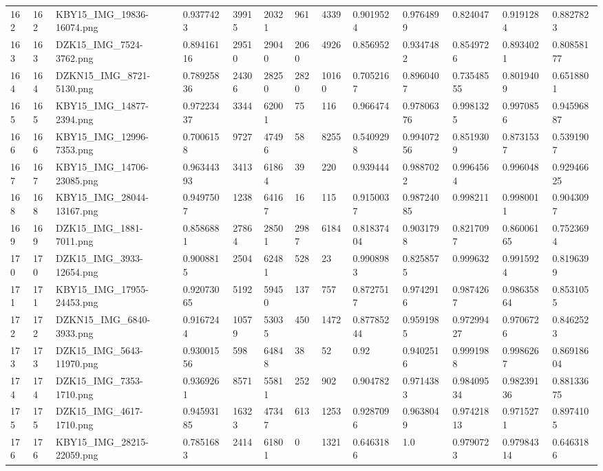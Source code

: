 \documentclass[11pt, a4paper, twoside]{report}
\begin{document}
\begin{longtable}[c]{@{}lllllllllllll@{}}
162 & 162 & KBY15\_IMG\_19836-16074.png & 0.9377423 & 39915 & 20321 & 961 & 4339 & 0.9019524 & 0.9764899 & 0.824047 & 0.9191284 & 0.8827823 \\
163 & 163 & DZK15\_IMG\_7524-3762.png & 0.89416116 & 29510 & 29040 & 2060 & 4926 & 0.856952 & 0.9347482 & 0.8549726 & 0.8934021 & 0.80858177 \\
164 & 164 & DZKN15\_IMG\_8721-5130.png & 0.78925836 & 24306 & 28250 & 2820 & 10160 & 0.7052167 & 0.8960407 & 0.73548555 & 0.8019409 & 0.6518801 \\
165 & 165 & KBY15\_IMG\_14877-2394.png & 0.97223437 & 3344 & 62001 & 75 & 116 & 0.966474 & 0.97806376 & 0.9981325 & 0.9970856 & 0.94596887 \\
166 & 166 & KBY15\_IMG\_12996-7353.png & 0.7006158 & 9727 & 47496 & 58 & 8255 & 0.5409298 & 0.99407256 & 0.8519309 & 0.8731537 & 0.5391907 \\
167 & 167 & KBY15\_IMG\_14706-23085.png & 0.96344393 & 3413 & 61864 & 39 & 220 & 0.939444 & 0.9887022 & 0.9964564 & 0.996048 & 0.92946625 \\
168 & 168 & KBY15\_IMG\_28044-13167.png & 0.9497507 & 1238 & 64167 & 16 & 115 & 0.9150037 & 0.98724085 & 0.998211 & 0.9980011 & 0.9043097 \\
169 & 169 & DZK15\_IMG\_1881-7011.png & 0.8586881 & 27864 & 28501 & 2987 & 6184 & 0.81837404 & 0.9031798 & 0.8217097 & 0.86006165 & 0.7523694 \\
170 & 170 & DZK15\_IMG\_3933-12654.png & 0.9008815 & 2504 & 62481 & 528 & 23 & 0.9908983 & 0.8258575 & 0.999632 & 0.9915924 & 0.8196399 \\
171 & 171 & KBY15\_IMG\_17955-24453.png & 0.92073065 & 5192 & 59450 & 137 & 757 & 0.8727517 & 0.9742916 & 0.9874267 & 0.98635864 & 0.8531055 \\
172 & 172 & DZKN15\_IMG\_6840-3933.png & 0.9167244 & 10579 & 53035 & 450 & 1472 & 0.87785244 & 0.9591985 & 0.97299427 & 0.9706726 & 0.8462523 \\
173 & 173 & DZK15\_IMG\_5643-11970.png & 0.93001556 & 598 & 64848 & 38 & 52 & 0.92 & 0.9402516 & 0.9991988 & 0.9986267 & 0.86918604 \\
174 & 174 & DZK15\_IMG\_7353-1710.png & 0.9369261 & 8571 & 55811 & 252 & 902 & 0.904782 & 0.9714383 & 0.98409534 & 0.98239136 & 0.88133675 \\
175 & 175 & DZK15\_IMG\_4617-1710.png & 0.94593185 & 16323 & 47347 & 613 & 1253 & 0.9287096 & 0.9638049 & 0.97421813 & 0.9715271 & 0.8974105 \\
176 & 176 & KBY15\_IMG\_28215-22059.png & 0.7851683 & 2414 & 61801 & 0 & 1321 & 0.6463186 & 1.0 & 0.9790723 & 0.97984314 & 0.6463186 \\

\end{longtable}
\end{document}
